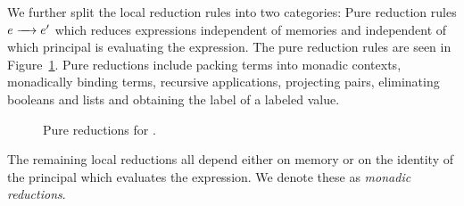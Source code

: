 We further split the local reduction rules into two categories: Pure reduction rules $\steppure{\expr}{\expr'}$ which reduces expressions independent of memories and independent of which principal is evaluating the expression. The pure reduction rules are seen in Figure~\ref{fig:pure-reductions}. Pure reductions include packing terms into monadic contexts, monadically binding terms, recursive applications, projecting pairs, eliminating booleans and lists and obtaining the label of a labeled value.

\begin{figure}
    \centering
    \caption{Pure reductions for \lang.}
    \label{fig:pure-reductions}
\end{figure}

The remaining local reductions all depend either on memory or on the identity of the principal which evaluates the expression. We denote these as \emph{monadic reductions}.

